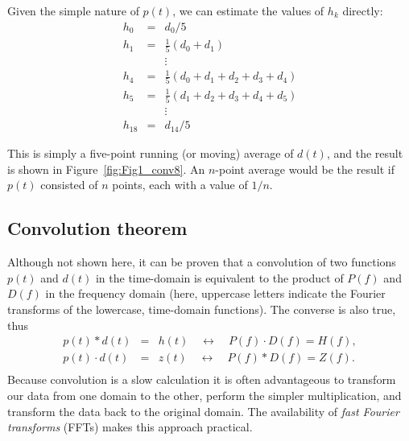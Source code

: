 \noindent
Given the simple nature of $p(t)$, we can estimate the values of $h_k$ directly:
\begin{equation}
\begin{array}{rcl}
h_0 & = & d_{0}/5 \\[4pt]
h_1 & = &  \frac{1}{5} (d_0 + d_1)\\
 & & \vdots \\
h_4 & = &  \frac{1}{5} ( d_0 + d_1 + d_2 + d_3 + d_4)\\[4pt]
h_5 & = & \frac{1}{5} ( d_1 + d_2 + d_3 + d_4 + d_5)\\
& & \vdots \\
h_{18}&  = & d_{14}/5 \end{array}
\end{equation}	 

\noindent
This is simply a five-point running (or moving) average of $d(t)$, and the result is shown in Figure~\ref{fig:Fig1_conv8}.
An $n$-point average would be the 
result if $p(t)$ consisted of $n$ points, each with a value of $1/n$.

\subsection{Convolution theorem}

Although not shown here, it can be proven that a convolution of two functions $p(t)$ and $d(t)$ 
in the time-domain is equivalent to the product of $P(f)$ and $D(f)$ in the frequency domain 
(here, uppercase letters indicate the Fourier transforms of the lowercase, time-domain functions).
The converse is also true, thus
\begin{equation}
\begin{array}{rcl}
p(t) * d(t) & = & h(t) \quad \leftrightarrow \quad P(f) \cdot D (f) = H(f),\\[4pt]
p(t) \cdot d(t) & = & z(t) \quad \leftrightarrow \quad P(f) * D (f) = Z(f).\\
\end{array}
\end{equation}
Because convolution is a slow calculation it is often advantageous to transform our data from one
domain to the other, perform the simpler multiplication, and transform the data back to the original
domain.  The availability of \emph{fast Fourier transforms} (FFTs) makes this approach practical.
